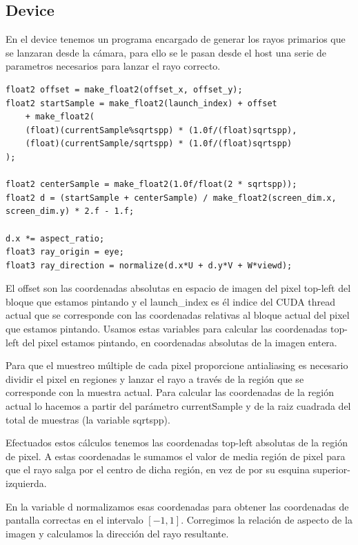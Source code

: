 \subsection{Device}

En el device tenemos un programa encargado de generar los rayos primarios que se lanzaran desde la cámara, para ello se le pasan desde el host una serie de parametros necesarios para lanzar el rayo correcto.

\begin{lstlisting}
float2 offset = make_float2(offset_x, offset_y);
float2 startSample = make_float2(launch_index) + offset 
	+ make_float2(
	(float)(currentSample%sqrtspp) * (1.0f/(float)sqrtspp),
	(float)(currentSample/sqrtspp) * (1.0f/(float)sqrtspp)
);

float2 centerSample = make_float2(1.0f/float(2 * sqrtspp));
float2 d = (startSample + centerSample) / make_float2(screen_dim.x, screen_dim.y) * 2.f - 1.f;

d.x *= aspect_ratio;
float3 ray_origin = eye;
float3 ray_direction = normalize(d.x*U + d.y*V + W*viewd);
\end{lstlisting}
El offset son las coordenadas absolutas en espacio de imagen del pixel top-left del bloque que estamos pintando y el launch\_index es él indice del CUDA thread actual que se corresponde con las coordenadas relativas al bloque actual del pixel que estamos pintando. Usamos estas variables para calcular las coordenadas top-left del pixel estamos pintando, en coordenadas absolutas de la imagen entera.

\medskip

Para que el muestreo múltiple de cada pixel proporcione antialiasing es necesario dividir el pixel en regiones y lanzar el rayo a través de la región que se corresponde con la muestra actual. Para calcular las coordenadas de la región actual lo hacemos a partir del parámetro currentSample y de la raiz cuadrada del total de muestras (la variable sqrtspp).

\medskip

Efectuados estos cálculos tenemos las coordenadas top-left absolutas de la región de pixel. A estas coordenadas le sumamos el valor de media región de pixel para que el rayo salga por el centro de dicha región, en vez de por su esquina superior-izquierda.

\medskip

En la variable d normalizamos esas coordenadas para obtener las coordenadas de pantalla correctas en el intervalo $[-1, 1]$. Corregimos la relación de aspecto de la imagen y calculamos la dirección del rayo resultante.

